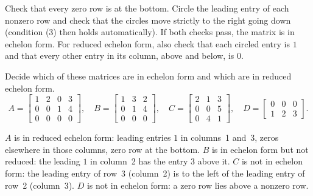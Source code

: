 \documentclass[10pt]{scrartcl}
\begin{document}
\begin{steps}
  \ii Check that every zero row is at the bottom.
  \ii Circle the leading entry of each nonzero row and check that the circles move strictly to the right going down (condition (3) then holds automatically). If both checks pass, the matrix is in echelon form.
  \ii For reduced echelon form, also check that each circled entry is $1$ and that every other entry in its column, above and below, is $0$.
\end{steps}

\begin{example*}
Decide which of these matrices are in echelon form and which are in reduced echelon form.
\[
  A=\begin{bmatrix}1&2&0&3\\0&0&1&4\\0&0&0&0\end{bmatrix},\quad
  B=\begin{bmatrix}1&3&2\\0&1&4\\0&0&0\end{bmatrix},\quad
  C=\begin{bmatrix}2&1&3\\0&0&5\\0&4&1\end{bmatrix},\quad
  D=\begin{bmatrix}0&0&0\\1&2&3\end{bmatrix}.
\]
\begin{itemize}
  \ii $A$ is in reduced echelon form: leading entries $1$ in columns~1 and~3, zeros elsewhere in those columns, zero row at the bottom.
  \ii $B$ is in echelon form but not reduced: the leading $1$ in column~2 has the entry $3$ above it.
  \ii $C$ is not in echelon form: the leading entry of row~3 (column~2) is to the left of the leading entry of row~2 (column~3).
  \ii $D$ is not in echelon form: a zero row lies above a nonzero row.
\end{itemize}
\end{example*}
\end{document}
